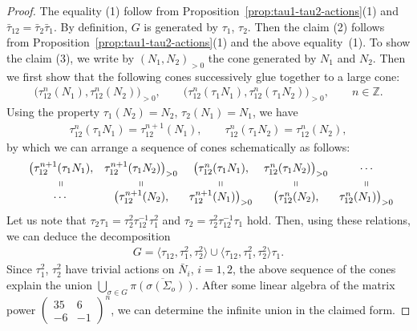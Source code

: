 \documentclass[10pt,a4paper]{amsart}
\numberwithin{equation}{section}
\begin{document}
\begin{proof} The equality (1) follow from Proposition~\ref{prop:tau1-tau2-actions}(1) and $\bar{\tau}_{12}=\bar{\tau}_{2}\bar{\tau}_{1}$. By definition, $G$ is generated by $\tau_{1}$, $\tau_{2}$. Then the claim (2) follows from Proposition~\ref{prop:tau1-tau2-actions}(1) and the above equality~(1). To show the claim (3), we write by $(N_{1},N_{2})_{>0}$ the cone generated by $N_{1}$ and $N_{2}$. Then we first show that
the following cones successively glue together to a large cone:
\begin{gather*}
\big(\tau_{12}^{n}(N_{1}),\tau_{12}^{n}(N_{2})\big)_{>0},\qquad \big(\tau_{12}^{n}(\tau_{1}N_{1}),\tau_{12}^{n}(\tau_{1}N_{2})\big)_{>0}, \qquad n\in\mathbb{Z}.
\end{gather*}
Using the property $\tau_{1}(N_{2})=N_{2}$, $\tau_{2}(N_{1})=N_{1}$, we have
\begin{gather*}
\tau_{12}^{n}(\tau_{1}N_{1})=\tau_{12}^{n+1}(N_{1}),\qquad \tau_{12}^{n}(\tau_{1}N_{2})=\tau_{12}^{n}(N_{2}),
\end{gather*}
by which we can arrange a sequence of cones schematically as follows:
\begin{gather*}
\begin{array}{@{}ccccccc}
 & \big(\tau_{12}^{n+1}(\tau_{1}N_{1}), & \tau_{12}^{n+1}(\tau_{1}N_{2})\big)_{>0} & \big(\tau_{12}^{n}(\tau_{1}N_{1}), & \tau_{12}^{n}(\tau_{1}N_{2})\big)_{>0} & \cdots\\
 & \shortparallel & \shortparallel & \shortparallel & \shortparallel & \shortparallel\\
 & \cdots & \big(\tau_{12}^{n+1}(N_{2}), & \tau_{12}^{n+1}(N_{1})\big)_{>0} & \big(\tau_{12}^{n}(N_{2}), & \tau_{12}^{n}(N_{1})\big)_{>0}
\end{array}
\end{gather*}
Let us note that $\tau_{2}\tau_{1}=\tau_{2}^{2}\tau_{12}^{-1}\tau_{1}^{2}$ and $\tau_{2}=\tau_{2}^{2}\tau_{12}^{-1}\tau_{1}$ hold. Then, using these relations, we can deduce the decomposition
\begin{gather*}
G=\big\langle\tau_{12},\tau_{1}^{2},\tau_{2}^{2}\big\rangle\cup\big\langle\tau_{12},\tau_{1}^{2},\tau_{2}^{2}\big\rangle\tau_{1}.
\end{gather*}
Since $\tau_{1}^{2}$, $\tau_{2}^{2}$ have trivial actions on $\bar{N}_{i}$, $i=1,2$, the above sequence of the cones explain the union $\bigcup_{\sigma\in G}\overline{\pi(\sigma(\Sigma_{o}))}$. After some linear algebra of the matrix power $\left(\begin{smallmatrix}35 & 6\\
-6 & -1
\end{smallmatrix}\right)^{n}$, we can determine the infinite union in the claimed form.
\end{proof}
\end{document}
